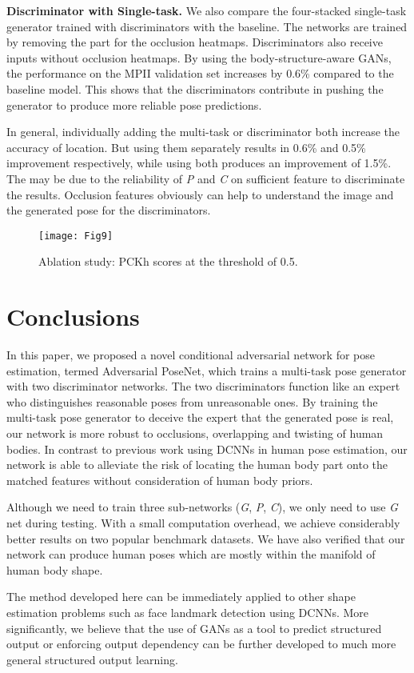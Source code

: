 \documentclass[10pt,letterpaper,twocolumn]{article}
\begin{document}
\textbf{Discriminator with Single-task.} We also compare the four-stacked single-task generator trained with discriminators with the baseline. The networks are trained by removing the part for the occlusion heatmaps. Discriminators also receive inputs without occlusion heatmaps. By using the body-structure-aware GANs, the performance on the MPII validation set increases by 0.6\% compared to the baseline model. This shows that the discriminators  contribute in pushing the generator to produce more reliable pose predictions.

In general, individually adding the multi-task or discriminator both increase the accuracy of location. But using them separately results in 0.6\% and 0.5\% improvement respectively, while using both produces an improvement of 1.5\%. The may be due to the reliability of \textit{P} and \textit{C }  on sufficient feature to discriminate the results. Occlusion features obviously can help to understand the image and the generated pose for the discriminators.

\begin{figure*}[h!]
\centering
\texttt{[image: Fig9]}
\caption{Ablation study: PCKh scores at the threshold of 0.5.}
\label{fig:9}
\end{figure*}

\section{Conclusions}

In this paper, we proposed a novel conditional adversarial network for pose estimation, termed Adversarial PoseNet, which trains a multi-task pose generator with two discriminator networks. The two discriminators function like an expert who distinguishes reasonable poses from unreasonable ones. By training the multi-task pose generator to deceive the expert that the generated pose is real, our network is more robust to occlusions, overlapping and twisting of human bodies. In contrast to previous work using DCNNs in human pose estimation, our network is able to alleviate  the risk of locating the human body part onto the  matched features  without consideration of human body priors. 

Although we need to train three sub-networks (\textit{G}, \textit{P}, \textit{C}), we only need to use \textit{G} net during testing. With a small computation overhead, we achieve considerably better results on two popular benchmark datasets. 
We have also verified that our network can produce human poses which are mostly within the manifold of human body shape.

The method developed here can be immediately applied to other shape estimation problems such as face landmark detection using DCNNs. More significantly, we believe that the use of GANs as a tool to predict structured  output  or enforcing output dependency can be further developed to much more general structured output learning.  





{\small


 }
\end{document}
